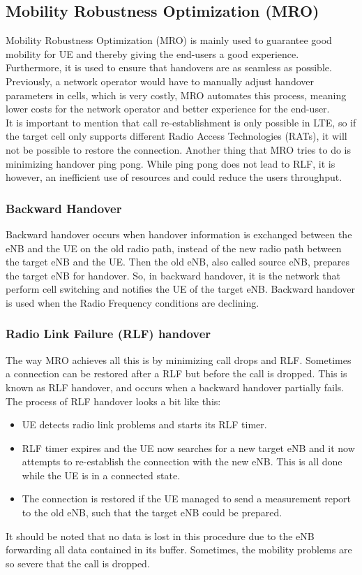 \documentclass{report}
\begin{document}
\subsection{Mobility Robustness Optimization (MRO)}
Mobility Robustness Optimization (MRO) is mainly used to guarantee good mobility for UE and thereby giving the end-users a good experience. Furthermore, it is used to ensure that handovers are as seamless as possible. Previously, a network operator would have to manually adjust handover parameters in cells, which is very costly, MRO automates this process, meaning lower costs for the network operator and better experience for the end-user. \\ It is important to mention that call re-establishment is only possible in LTE, so if the target cell only supports different Radio Access Technologies (RATs), it will not be possible to restore the connection. 
Another thing that MRO tries to do is minimizing handover ping pong. While ping pong does not lead to RLF, it is however, an inefficient use of resources and could reduce the users throughput. \cite{Sartori2012}

\subsubsection{Backward Handover}
Backward handover occurs when handover information is exchanged between the eNB and the UE on the old radio path, instead of the new radio path between the target eNB and the UE. Then the old eNB, also called source eNB, prepares the target eNB for handover. So, in backward handover, it is the network that perform cell switching and notifies the UE of the target eNB. 
Backward handover is used when the Radio Frequency conditions are declining. \cite{Qualcomm2010}

\subsubsection{Radio Link Failure (RLF) handover}
The way MRO achieves all this is by minimizing call drops and RLF. Sometimes a connection can be restored after a RLF but before the call is dropped. This is known as RLF handover, and occurs when a backward handover partially fails. The process of RLF handover looks a bit like this: 
\begin{itemize}
	\item UE detects radio link problems and starts its RLF timer.
	\item RLF timer expires and the UE now searches for a new target eNB and it now attempts to re-establish the connection with the new eNB. This is all done while the UE is in a connected state. 
	\item The connection is restored if the UE managed to send a measurement report to the old eNB, such that the target eNB could be prepared.\cite{Qualcomm2010}  %
\end{itemize}
It should be noted that no data is lost in this procedure due to the eNB forwarding all data contained in its buffer. 
Sometimes, the mobility problems are so severe that the call is dropped. 
\end{document}
